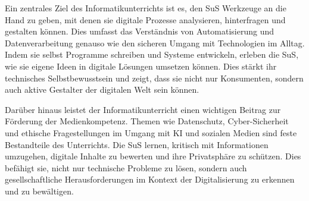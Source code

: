 \documentclass[a4paper,12pt]{article}
\begin{document}
Ein zentrales Ziel des Informatikunterrichts ist es, den SuS Werkzeuge an die Hand zu geben, mit denen sie digitale Prozesse analysieren, hinterfragen und gestalten können. Dies umfasst das Verständnis von Automatisierung und Datenverarbeitung genauso wie den sicheren Umgang mit Technologien im Alltag. Indem sie selbst Programme schreiben und Systeme entwickeln, erleben die SuS, wie sie eigene Ideen in digitale Lösungen umsetzen können. Dies stärkt ihr technisches Selbstbewusstsein und zeigt, dass sie nicht nur Konsumenten, sondern auch aktive Gestalter der digitalen Welt sein können.

Darüber hinaus leistet der Informatikunterricht einen wichtigen Beitrag zur Förderung der Medienkompetenz. Themen wie Datenschutz, Cyber-Sicherheit und ethische Fragestellungen im Umgang mit KI und sozialen Medien sind feste Bestandteile des Unterrichts. Die SuS lernen, kritisch mit Informationen umzugehen, digitale Inhalte zu bewerten und ihre Privatsphäre zu schützen. Dies befähigt sie, nicht nur technische Probleme zu lösen, sondern auch gesellschaftliche Herausforderungen im Kontext der Digitalisierung zu erkennen und zu bewältigen.
\end{document}
